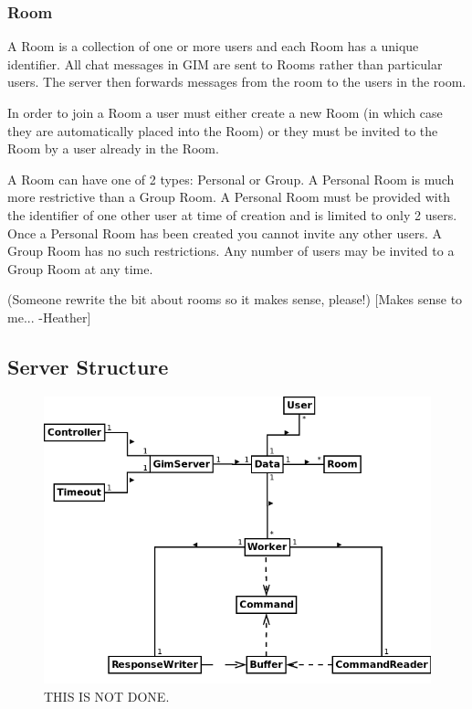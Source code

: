 \subsubsection{Room}
A Room is a collection of one or more users and each Room has a unique identifier. All chat messages in GIM are sent to Rooms rather than particular users. The server then forwards messages from the room to the users in the room.

In order to join a Room a user must either create a new Room (in which case they are automatically placed into the Room) or they must be invited to the Room by a user already in the Room. 

A Room can have one of 2 types: Personal or Group. A Personal Room is much more restrictive than a Group Room. A Personal Room must be provided with the identifier of one other user at time of creation and is limited to only 2 users. Once a Personal Room has been created you cannot invite any other users. A Group Room has no such restrictions. Any number of users may be invited to a Group Room at any time.

(Someone rewrite the bit about rooms so it makes sense, please!) [Makes sense to me... -Heather]

\subsection{Server Structure}

\begin{figure}[!h]
    \begin{center}
        \includegraphics[scale=0.65]{chapter2/diagrams/server_uml.png}
        \caption{THIS IS NOT DONE.}
        \label{highLevelDia}
    \end{center}
\end{figure}

